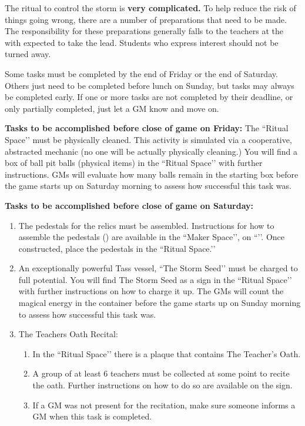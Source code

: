 \documentclass[green]{GL2020}
\begin{document}
\name{\gPreparingTheRitual{}}

The ritual to control the storm is \textbf{very complicated.} To help reduce the risk of things going wrong, there are a number of preparations that need to be made. The responsibility for these preparations generally falls to the teachers at the \pSchool{} with \cLibrarian{\full} expected to take the lead. Students who express interest should not be turned away.

Some tasks must be completed by the end of Friday or the end of Saturday. Others just need to be completed before lunch on Sunday, but tasks may always be completed early. If one or more tasks are not completed by their deadline, or only partially completed, just let a GM know and move on.

\textbf{Tasks to be accomplished before close of game on Friday:}
The ``Ritual Space’’ must be physically cleaned. This activity is simulated via a cooperative, abstracted mechanic (no one will be actually physically cleaning.) You will find a box of ball pit balls (physical items) in the ``Ritual Space’’ with further instructions. GMs will evaluate how many balls remain in the starting box before the game starts up on Saturday morning to assess how successful this task was.

\textbf{Tasks to be accomplished before close of game on Saturday:}
\begin{enumerate}
  \item The pedestals for the relics must be assembled. Instructions for how to assemble the pedestals (\iPedestal{}) are available in the ``Maker Space’’, on ``\sSignF’’. Once constructed, place the pedestals in the ``Ritual Space.’’
  \item An exceptionally powerful Tass vessel, ``The Storm Seed’’ must be charged to full potential. You will find The Storm Seed as a sign in the ``Ritual Space’’ with further instructions on how to charge it up. The GMs will count the magical energy in the container before the game starts up on Sunday morning to assess how successful this task was.
  \item The Teachers Oath Recital:
  \begin{enumerate}
    \item In the ``Ritual Space’’ there is a plaque that contains The Teacher’s Oath.
    \item A group of at least 6 teachers must be collected at some point to recite the oath. Further instructions on how to do so are available on the sign.
    \item If a GM was not present for the recitation, make sure someone informs a GM when this task is completed.
  \end{enumerate}
\end{enumerate}
\end{document}
